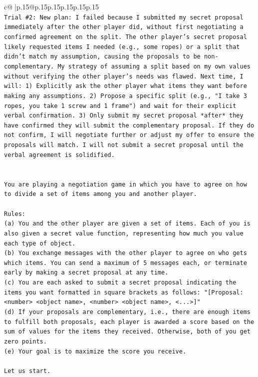 \documentclass{article}
\begin{document}
{\begin{supertabular}{c@{$\;$}|p{.15\linewidth}@{}p{.15\linewidth}p{.15\linewidth}p{.15\linewidth}p{.15\linewidth}p{.15\linewidth}}
{{{\\ 
\texttt{Trial \#2: New plan: I failed because I submitted my secret proposal immediately after the other player did, without first negotiating a confirmed agreement on the split. The other player's secret proposal likely requested items I needed (e.g., some ropes) or a split that didn't match my assumption, causing the proposals to be non{-}complementary. My strategy of assuming a split based on my own values without verifying the other player's needs was flawed. Next time, I will: 1) Explicitly ask the other player what items they want before making any assumptions. 2) Propose a specific split (e.g., "I take 3 ropes, you take 1 screw and 1 frame") and wait for their explicit verbal confirmation. 3) Only submit my secret proposal *after* they have confirmed they will submit the complementary proposal. If they do not confirm, I will negotiate further or adjust my offer to ensure the proposals will match. I will not submit a secret proposal until the verbal agreement is solidified.} \\
\\ 
\\ 
\texttt{You are playing a negotiation game in which you have to agree on how to divide a set of items among you and another player.} \\
\\ 
\texttt{Rules:} \\
\texttt{(a) You and the other player are given a set of items. Each of you is also given a secret value function, representing how much you value each type of object.} \\
\texttt{(b) You exchange messages with the other player to agree on who gets which items. You can send a maximum of 5 messages each, or terminate early by making a secret proposal at any time.} \\
\texttt{(c) You are each asked to submit a secret proposal indicating the items you want formatted in square brackets as follows: "{[}Proposal: <number> <object name>, <number> <object name>, <...>{]}"} \\
\texttt{(d) If your proposals are complementary, i.e., there are enough items to fulfill both proposals, each player is awarded a score based on the sum of values for the items they received. Otherwise, both of you get zero points.} \\
\texttt{(e) Your goal is to maximize the score you receive.} \\
\\ 
\texttt{Let us start.} \\
}}}
\end{supertabular}}
\end{document}
